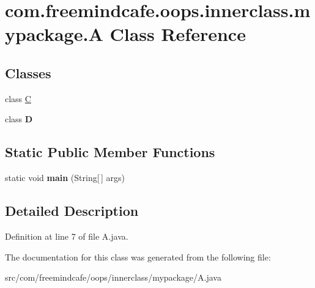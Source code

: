 \hypertarget{classcom_1_1freemindcafe_1_1oops_1_1innerclass_1_1mypackage_1_1_a}{}\section{com.\+freemindcafe.\+oops.\+innerclass.\+mypackage.\+A Class Reference}
\label{classcom_1_1freemindcafe_1_1oops_1_1innerclass_1_1mypackage_1_1_a}
\subsection*{Classes}
\begin{DoxyCompactItemize}
\item 
class \hyperlink{classcom_1_1freemindcafe_1_1oops_1_1innerclass_1_1mypackage_1_1_a_1_1_c}{C}
\item 
class {\bfseries D}
\end{DoxyCompactItemize}
\subsection*{Static Public Member Functions}
\begin{DoxyCompactItemize}
\item 
\hypertarget{classcom_1_1freemindcafe_1_1oops_1_1innerclass_1_1mypackage_1_1_a_afe12777250479d842c3daf883a2bcd90}{}static void {\bfseries main} (String\mbox{[}$\,$\mbox{]} args)\label{classcom_1_1freemindcafe_1_1oops_1_1innerclass_1_1mypackage_1_1_a_afe12777250479d842c3daf883a2bcd90}

\end{DoxyCompactItemize}


\subsection{Detailed Description}


Definition at line 7 of file A.\+java.



The documentation for this class was generated from the following file\+:\begin{DoxyCompactItemize}
\item 
src/com/freemindcafe/oops/innerclass/mypackage/A.\+java\end{DoxyCompactItemize}
